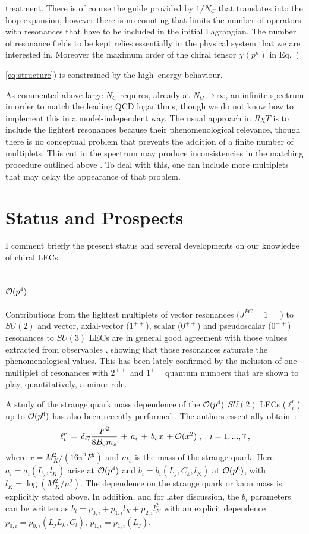 \documentclass{appolb}
\begin{document}
treatment. There is of course the guide provided by $1/N_C$ that translates into the loop expansion, however there is no counting that limits the number of operators with resonances that have to be included in the initial Lagrangian. The number of resonance fields to be kept relies essentially in the physical system that we are interested in. Moreover the maximum order of the chiral tensor $\chi (p^n)$ in Eq.~({\ref{eq:structure}) is constrained by the high--energy behaviour. 
\par
As commented above large-$N_C$ requires, already at $N_C \rightarrow \infty$, an infinite spectrum in order to match the leading QCD logarithms, though we do not know how to implement this in a model-independent way. The usual approach in $R \chi T$ is to include the lightest resonances because their phenomenological relevance, though there is no conceptual problem that prevents the addition of a finite number of multiplets. This cut in the spectrum  may produce inconsistencies in the matching procedure outlined above \cite{Bijnens:2003rc}. To deal with this, one can include more multiplets that may delay the appearance of that problem. 

\section{Status and Prospects}
I comment briefly the present status and several developments on our knowledge of chiral LECs.

\subsection{${\cal O}(p^4)$}
Contributions from the lightest multiplets of vector resonances ($J^{PC}=1^{--}$) to $SU(2)$ \cite{Gasser:1983yg} 
and vector, axial-vector ($1^{++}$), scalar ($0^{++}$) and pseudoscalar ($0^{-+}$) resonances to $SU(3)$ \cite{Ecker:1988te} LECs
are in general good agreement with those values extracted from observables \cite{Amoros:2001cp},
showing that those resonances saturate the phenomenological values. This has been lately
confirmed by the inclusion of one multiplet of resonances with $2^{++}$ and $1^{+-}$ quantum numbers
\cite{Ecker:2007us} that are shown to play, quantitatively, a minor role.
\par
A study of the strange quark mass dependence of the ${\cal O}(p^4)$ $SU(2)$ LECs ($\ell_i^r$) up to ${\cal O}(p^6)$
has also been recently performed \cite{Gasser:2007sg}. The authors essentially obtain~:
\begin{equation}
\ell_i^r \, = \, \delta_{i7} \frac{F^2}{8 B_0 m_s} \, + \, a_i \, + \, b_i \, x \, + {\cal O}(x^2) \; ,
\; \; \; i=1,...,7 \, ,
\end{equation}
where $x=M_K^2/(16 \pi^2 F^2)$ and $m_s$ is the mass of the strange quark. Here $a_i = a_i(L_j,l_K)$
arise at ${\cal O}(p^4)$ and $b_i = b_i(L_j,C_k,l_K)$ at ${\cal O}(p^6)$, with $l_K=\log(M_K^2/\mu^2)$.
The dependence on the strange quark or kaon mass is explicitly stated above. In addition, and for later
discussion, the $b_i$ parameters can be written as $b_i = p_{0,i} + p_{1,i} l_K + p_{2,i} l_K^2$ with
an explicit dependence $p_{0,i}= p_{0,i}(L_j L_k, C_l)$, $p_{1,i} = p_{1,i}(L_j)$.

}
\end{document}
